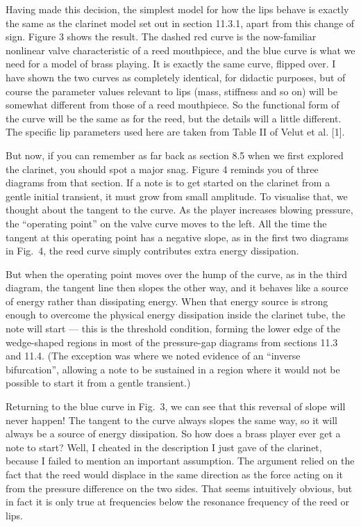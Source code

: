   Having made this decision, the simplest model for how the lips behave is 
  exactly the same as the clarinet model set out in section 11.3.1, apart from 
  this change of sign. Figure 3 shows the result. The dashed red curve is the 
  now-familiar nonlinear valve characteristic of a reed mouthpiece, and the 
  blue curve is what we need for a model of brass playing. It is exactly the 
  same curve, flipped over. I have shown the two curves as completely 
  identical, for didactic purposes, but of course the parameter values relevant 
  to lips (mass, stiffness and so on) will be somewhat different from those of 
  a reed mouthpiece. So the functional form of the curve will be the same as 
  for the reed, but the details will a little different. The specific lip 
  parameters used here are taken from Table II of Velut et al. [1]. 


  But now, if you can remember as far back as section 8.5 when we first 
  explored the clarinet, you should spot a major snag. Figure 4 reminds you of 
  three diagrams from that section. If a note is to get started on the clarinet 
  from a gentle initial transient, it must grow from small amplitude. To 
  visualise that, we thought about the tangent to the curve. As the player 
  increases blowing pressure, the “operating point” on the valve curve moves to 
  the left. All the time the tangent at this operating point has a negative 
  slope, as in the first two diagrams in Fig.\ 4, the reed curve simply 
  contributes extra energy dissipation. 

  But when the operating point moves over the hump of the curve, as in the 
  third diagram, the tangent line then slopes the other way, and it behaves 
  like a source of energy rather than dissipating energy. When that energy 
  source is strong enough to overcome the physical energy dissipation inside 
  the clarinet tube, the note will start — this is the threshold condition, 
  forming the lower edge of the wedge-shaped regions in most of the 
  pressure-gap diagrams from sections 11.3 and 11.4. (The exception was where 
  we noted evidence of an ``inverse bifurcation'', allowing a note to be 
  sustained in a region where it would not be possible to start it from a 
  gentle transient.) 

  Returning to the blue curve in Fig.\ 3, we can see that this reversal of 
  slope will never happen! The tangent to the curve always slopes the same way, 
  so it will always be a source of energy dissipation. So how does a brass 
  player ever get a note to start? Well, I cheated in the description I just 
  gave of the clarinet, because I failed to mention an important assumption. 
  The argument relied on the fact that the reed would displace in the same 
  direction as the force acting on it from the pressure difference on the two 
  sides. That seems intuitively obvious, but in fact it is only true at 
  frequencies below the resonance frequency of the reed or lips. 


